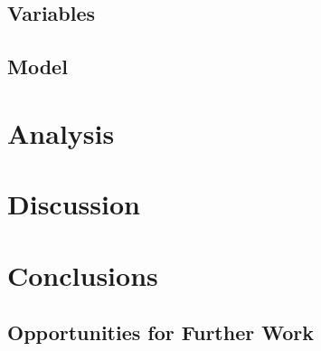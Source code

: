 \documentclass[12pt]{article}
\begin{document}
\subsection{Variables}


\subsection{Model}



	\section{Analysis}
	


	\section{Discussion}



	\section{Conclusions}


\subsection{Opportunities for Further Work}
\end{document}
